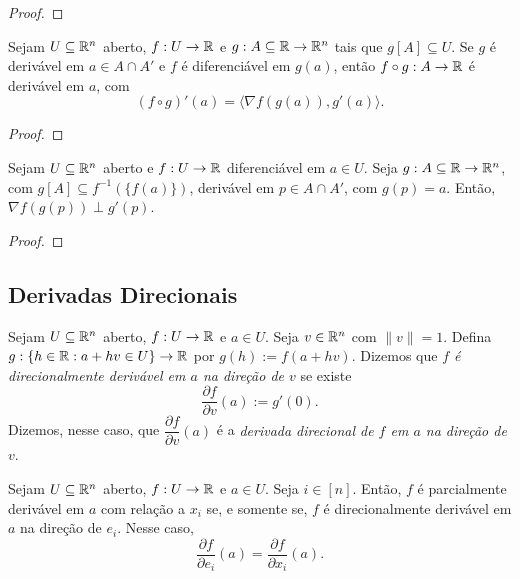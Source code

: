\begin{proof}
    \blackproof
\end{proof}

\begin{theorem}
    Sejam $U \subseteq \mathbb{R}^n$ aberto, $f : U \to \mathbb{R}$ e $g : A \subseteq \mathbb{R} \to \mathbb{R}^n$ tais que $g[A] \subseteq U$. Se $g$ é derivável em $a \in A \cap A'$ e $f$ é diferenciável em $g(a)$, então $f \circ g : A \to \mathbb{R}$ é derivável em $a$, com
        \[
            (f \circ g)'(a) = \langle \nabla f(g(a)), g'(a) \rangle.
        \]
\end{theorem}

\begin{proof}
    \blackproof
\end{proof}

\begin{proposition}
    Sejam $U \subseteq \mathbb{R}^n$ aberto e $f : U \to \mathbb{R}$ diferenciável em $a \in U$. Seja $g : A \subseteq \mathbb{R} \to \mathbb{R}^n$, com $g[A] \subseteq f^{-1}(\{f(a)\})$, derivável em $p \in A \cap A'$, com $g(p)=a$. Então, $\nabla f(g(p)) \perp g'(p)$.
\end{proposition}

\begin{proof}
    \blackproof
\end{proof}

\subsection{Derivadas Direcionais}

\begin{definition}
    Sejam $U \subseteq \mathbb{R}^n$ aberto, $f : U \to \mathbb{R}$ e $a \in U$. Seja $v \in \mathbb{R}^n$ com $\|v \| = 1$. Defina $g : \{h \in \mathbb{R} : a + hv \in U\} \to \mathbb{R}$ por $g(h) := f(a+hv)$. Dizemos que \emph{$f$ é direcionalmente derivável em $a$ na direção de $v$} se existe
        \[
            \dfrac{\partial f}{\partial v} (a) := g'(0).
        \]
    Dizemos, nesse caso, que $\dfrac{\partial f}{\partial v} (a)$ é a \emph{derivada direcional de $f$ em $a$ na direção de $v$}.
\end{definition}

\begin{corollary}
    Sejam $U \subseteq \mathbb{R}^n$ aberto, $f : U \to \mathbb{R}$ e $a \in U$. Seja $i \in [n]$. Então, $f$ é parcialmente derivável em $a$ com relação a $x_i$ se, e somente se, $f$ é direcionalmente derivável em $a$ na direção de $e_i$. Nesse caso,
        \[
            \dfrac{\partial f}{\partial e_i}(a) = \dfrac{\partial f}{\partial x_i}(a).
        \]
\end{corollary}

